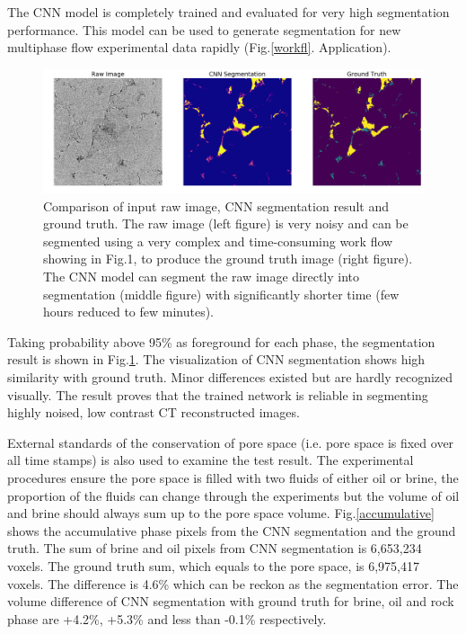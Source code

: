 \documentclass[draft,linenumbers]{agujournal2018}
\begin{document}
The CNN model is completely trained and evaluated for very high segmentation performance. This model can be used to generate segmentation for new multiphase flow experimental data rapidly (Fig.\ref{workfl}. Application).

\begin{figure}[h]
 \centering
 \includegraphics[width=33pc]{imgs/17_test_result.png}
 \caption{Comparison of input raw image, CNN segmentation result and ground truth. The raw image (left figure) is very noisy and can be segmented using a very complex and time-consuming work flow showing in Fig.1, to produce the ground truth image (right figure). The CNN model can segment the raw image directly into segmentation (middle figure) with significantly shorter time (few hours reduced to few minutes).}
 \label{result}
 \end{figure}

Taking probability above 95\% as foreground for each phase, the segmentation result is shown in Fig.\ref{result}. The visualization of CNN segmentation shows high similarity with ground truth. Minor differences existed but are hardly recognized visually. The result proves that the trained network is reliable in segmenting highly noised, low contrast CT reconstructed images.

External standards of the conservation of pore space (i.e. pore space is fixed over all time stamps) is also used to examine the test result. The experimental procedures ensure the pore space is filled with two fluids of either oil or brine, the proportion of the fluids can change through the experiments but the volume of oil and brine should always sum up to the pore space volume. Fig.\ref{accumulative} shows the accumulative phase pixels from the CNN segmentation and the ground truth. The sum of brine and oil pixels from CNN segmentation is 6,653,234 voxels. The ground truth sum, which equals to the pore space, is 6,975,417 voxels. The difference is 4.6\% which can be reckon as the segmentation error. The volume difference of CNN segmentation with ground truth for brine, oil and rock phase are +4.2\%, +5.3\% and less than -0.1\% respectively. 
\end{document}
